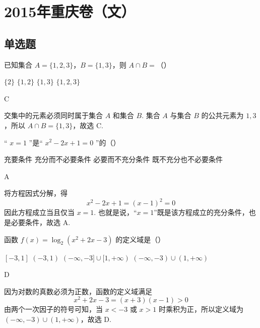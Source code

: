 \chapter{2015年重庆卷（文）}

\section{单选题}

\begin{problem}
已知集合 \(A = \{1, 2, 3\}\)，\(B = \{1, 3\}\)，则 \(A \cap B =\)（\quad）

\choices
    {\(\{2\}\)}
    {\(\{1,2\}\)}
    {\(\{1,3\}\)}
    {\(\{1,2,3\}\)}
\end{problem}

\begin{answer}
C
\end{answer}

\begin{solution}
交集中的元素必须同时属于集合 \(A\) 和集合 \(B\). 集合 \(A\) 与集合 \(B\) 的公共元素为 \(1,3\)，所以 \(A\cap B=\{1,3\}\)，故选 C.
\end{solution}

\begin{problem}
“ \(x = 1\) ”是“ \(x^{2} - 2x + 1 = 0\) ”的（\quad）

\choices
    {充要条件}
    {充分而不必要条件}
    {必要而不充分条件}
    {既不充分也不必要条件}
\end{problem}

\begin{answer}
A
\end{answer}

\begin{solution}
将方程因式分解，得
\[
x^{2}-2x+1=(x-1)^{2}=0
\]
因此方程成立当且仅当 \(x=1\). 也就是说，“\(x=1\)”既是该方程成立的充分条件，也是必要条件，故选 A.
\end{solution}

\begin{problem}
函数 \(f(x) = \log_2 (x^2 + 2x - 3)\) 的定义域是（\quad）

\choices
    {\([-3, 1]\)}
    {\((-3, 1)\)}
    {\((-\infty, -3] \cup [1, +\infty)\)}
    {\((-\infty, -3) \cup (1, +\infty)\)}
\end{problem}

\begin{answer}
D
\end{answer}

\begin{solution}
因为对数的真数必须为正数，函数的定义域满足
\[
x^{2}+2x-3=(x+3)(x-1)>0
\]
由两个一次因子的符号可知，当 \(x<-3\) 或 \(x>1\) 时乘积为正，所以定义域为 \((-\infty,-3)\cup(1,+\infty)\)，故选 D.
\end{solution}

